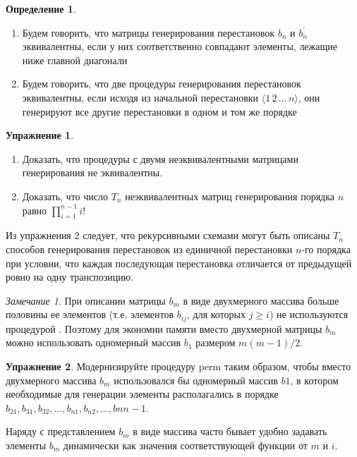 \documentclass[12pt,a4paper]{article}
\theoremstyle{plain}
\theoremstyle{definition}
\newtheorem{definition}{Определение}
\newtheorem*{task}{Упражнение}
\theoremstyle{remark}
\newtheorem*{remark}{Замечание}
\begin{document}
\begin{definition}
~\\
\begin{enumerate}
\item Будем говорить, что матрицы генерирования перестановок $b_n$ и $b_n^{'}$ эквивалентны, если у них соответственно совпадают элементы, лежащие ниже главной диагонали
\item Будем говорить, что две процедуры генерирования перестановок эквивалентны, если исходя из начальной перестановки $\langle 1\,2\,\ldots\,n\rangle$, они генерируют все другие перестановки в одном и том же порядке
\end{enumerate}
\end{definition}

\begin{task}
~\\
\begin{enumerate}
\item Доказать, что процедуры \verb@PERM@ с двумя неэквивалентными матрицами генерирования не эквивалентны.
\item Доказать, что число $T_n$ неэквивалентных матриц генерирования порядка $n$ равно $\prod_{i=1}^{n-1} i!$
\end{enumerate}
\end{task}

Из упражнения 2 следует, что рекурсивными схемами могут быть описаны $T_n$ способов генерирования перестановок из единичной перестановки $n$-го порядка при условии, что каждая последующая перестановка отличается от предыдущей ровно на одну транспозицию.

\begin{remark}
При описании матрицы $b_m$ в виде двухмерного массива больше половины ее элементов (т.е. элементов $b_{ij}$, для которых $j\ge i$) не используются процедурой \verb@PERM@. Поэтому для экономии памяти вместо двухмерной матрицы $b_m$ можно использовать одномерный массив $b_1$ размером $m(m-1)/2$.
\end{remark}

\begin{task}
Модернизируйте процедуру perm таким образом, чтобы вместо двухмерного массива $b_m$ использовался бы одномерный массив $b1$, в котором необходимые для генерации элементы располагались в порядке $b_{21}, b_{31}, b_{32},\ldots,b_{n1}, b_{n2},\ldots,b{nn-1}$.
\end{task}

Наряду с представлением $b_m$ в виде массива часто бывает удобно задавать элементы $b_m$ динамически как значения соответствующей функции от $m$ и $i$.
\end{document}
